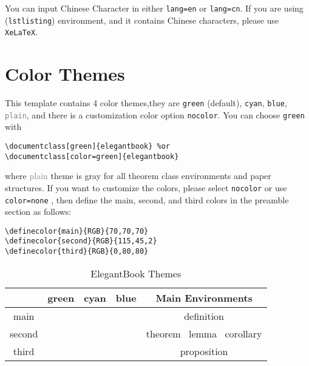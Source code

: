 \documentclass[noanswer,fancy,blue,11pt]{elegantbook}
\begin{document}
\begin{remark}
You can input Chinese Character in either \lstinline{lang=en} or \lstinline{lang=cn}. If you are using (\lstinline{lstlisting}) environment, and it contains Chinese characters, please use \lstinline{XeLaTeX}.
\end{remark}


\section{Color Themes}
This template contains 4 color themes,they are \textcolor{main1}{\lstinline{green}} (default), \textcolor{main2}{\lstinline{cyan}}, \textcolor{main3}{\lstinline{blue}}, \textcolor{gray}{\lstinline{plain}}, and there is a customization color option  \lstinline{nocolor}. You can choose \lstinline{green} with  
\begin{lstlisting}
\documentclass[green]{elegantbook} %or
\documentclass[color=green]{elegantbook}
\end{lstlisting}

where \textcolor{gray}{plain} theme is gray for all theorem class environments and paper structures. If you want to customize the colors, please select \lstinline{nocolor} or use \lstinline{color=none} , then define the main, second, and third colors in the preamble section as follows:
\begin{lstlisting}[frame=single]
\definecolor{main}{RGB}{70,70,70}    
\definecolor{second}{RGB}{115,45,2}    
\definecolor{third}{RGB}{0,80,80}   
\end{lstlisting}

\begin{table}[htp]
\caption{ElegantBook Themes\label{tab:color thm}}
\centering
\begin{tabular}{ccccc}
\toprule
	  & \textcolor{main1}{green} & \textcolor{main2}{cyan} & \textcolor{main3}{blue} & Main Environments\\
\midrule
main & \makecell{{\color{main1}\rule{1cm}{1cm}}}& \makecell{{\color{main2}\rule{1cm}{1cm}}}&\makecell{ {\color{main3}\rule{1cm}{1cm}}}& definition \\

second &\makecell{ {\color{second1}\rule{1cm}{1cm}}}& \makecell{{\color{second2}\rule{1cm}{1cm}}}&\makecell{ {\color{second3}\rule{1cm}{1cm}}}&theorem \ lemma \ corollary\\

third &\makecell{ {\color{third1}\rule{1cm}{1cm}}}& \makecell{{\color{third2}\rule{1cm}{1cm}}}&\makecell{ {\color{third3}\rule{1cm}{1cm}}}&proposition\\
\bottomrule
\end{tabular}
\end{table}
\end{document}
